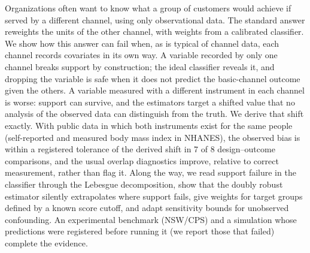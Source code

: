 Organizations often want to know what a group of customers would achieve if served by a different channel, using only observational data. The standard answer reweights the units of the other channel, with weights from a calibrated classifier. We show how this answer can fail when, as is typical of channel data, each channel records covariates in its own way. A variable recorded by only one channel breaks support by construction; the ideal classifier reveals it, and dropping the variable is safe when it does not predict the basic-channel outcome given the others. A variable measured with a different instrument in each channel is worse: support can survive, and the estimators target a shifted value that no analysis of the observed data can distinguish from the truth. We derive that shift exactly. With public data in which both instruments exist for the same people (self-reported and measured body mass index in NHANES), the observed bias is within a registered tolerance of the derived shift in 7 of 8 design--outcome comparisons, and the usual overlap diagnostics improve, relative to correct measurement, rather than flag it. Along the way, we read support failure in the classifier through the Lebesgue decomposition, show that the doubly robust estimator silently extrapolates where support fails, give weights for target groups defined by a known score cutoff, and adapt sensitivity bounds for unobserved confounding. An experimental benchmark (NSW/CPS) and a simulation whose predictions were registered before running it (we report those that failed) complete the evidence.
